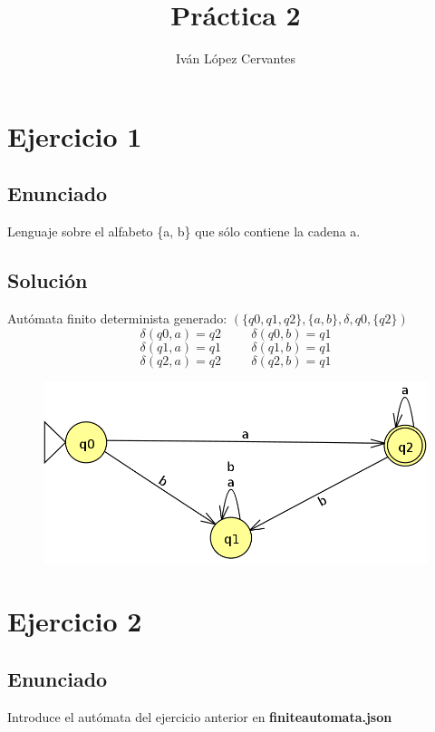 \documentclass[12pt]{article}
\title{Práctica 2}
\author{Iván López Cervantes}
\date{}
\begin{document}
\maketitle
\section*{Ejercicio 1}
\subsection*{Enunciado}
Lenguaje sobre el alfabeto \{a, b\} que sólo contiene la cadena a.
\subsection*{Solución}
Autómata finito determinista generado:
$(\{q0, q1, q2\},\{a, b\}, \delta, q0, \{q2\})$
\begin{equation*}
\delta(q0, a) = q2 \hspace{1cm} \delta(q0, b) = q1
\end{equation*}
\begin{equation*}
\delta(q1, a) = q1 \hspace{1cm} \delta(q1, b) = q1
\end{equation*}
\begin{equation*}
\delta(q2, a) = q2 \hspace{1cm} \delta(q2, b) = q1
\end{equation*}
\begin{figure}[h]
    \centering
    \includegraphics[scale=0.5]{DFA.png}
\end{figure}

\section*{Ejercicio 2}
\subsection*{Enunciado}
Introduce el autómata del ejercicio anterior en \textbf{finiteautomata.json}
\end{document}
